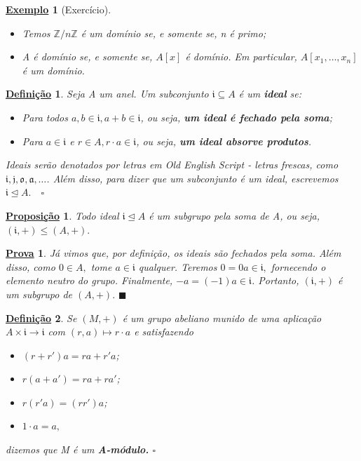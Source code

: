 \documentclass{article}
\newtheorem*{def*}{\underline{Defini\c c\~ao}}
\newtheorem*{prop*}{\underline{Proposi\c c\~ao}}
\newtheorem{example}{\underline{Exemplo}}
\newtheorem*{proof*}{\underline{Prova}}
\renewcommand\qedsymbol{$\blacksquare$}
\begin{document}
\begin{example}[Exercício]
  \begin{itemize}
    \item[1)] Temos \(\mathbb{Z}/n \mathbb{Z}\) é um domínio se, e somente se, n é primo;
    \item[2)] A é domínio se, e somente se, \(A[x]\) é domínio. Em particular, \(A[x_{1}, \dotsc , x_{n}]\) é um domínio.
  \end{itemize}
\end{example}
\begin{def*}
  Seja A um anel. Um subconjunto \(\mathfrak{i}\subseteq{A}\) é um \textbf{ideal} se:
  \begin{itemize}
    \item[1)] Para todos \(a, b\in \mathfrak{i}, a + b\in \mathfrak{i}\), ou seja, \textbf{um ideal é fechado pela soma};
    \item[2)] Para \(a\in \mathfrak{i}\) e \(r\in A, r \cdot a\in \mathfrak{i}\), ou seja, \textbf{um ideal absorve produtos}.
  \end{itemize}
  Ideais serão denotados por letras em \textit{Old English Script} - letras frescas, como \(\mathfrak{i}, \mathfrak{j}, \mathfrak{o}, \mathfrak{a}, \dotsc\).
  Além disso, para dizer que um subconjunto é um ideal, escrevemos \(\mathfrak{i} \trianglelefteq{A}.\quad\square\)
\end{def*}
\begin{prop*}
  Todo ideal \(\mathfrak{i}\trianglelefteq{A}\) é um subgrupo pela soma de A, ou seja, \((\mathfrak{i}, +)\leq (A, +).\)
\end{prop*}
\begin{proof*}
  Já vimos que, por definição, os ideais são fechados pela soma. Além disso, como \(0\in A,\) 
  tome \(a\in \mathfrak{i}\) qualquer. Teremos \(0 = 0a\in \mathfrak{i},\) fornecendo o elemento neutro do grupo.
  Finalmente, \(-a = (-1)a\in \mathfrak{i}\). Portanto, \((\mathfrak{i}, +)\) é um subgrupo de \((A, +).\) \qedsymbol
\end{proof*}
\begin{def*}
  Se \((M, +)\) é um grupo abeliano munido de uma aplicação \(A\times \mathfrak{i}\longrightarrow \mathfrak{i}\) com \((r, a)\mapsto r \cdot a\)
  e satisfazendo
  \begin{itemize}
    \item \((r + r')a = ra + r'a\);
    \item \(r(a + a') = ra + ra'\);
    \item \(r(r'a) = (rr')a\);
    \item \(1 \cdot a = a,\)
  \end{itemize}
  dizemos que M é um \textbf{A-módulo.} \(\square\)
\end{def*}
\end{document}
